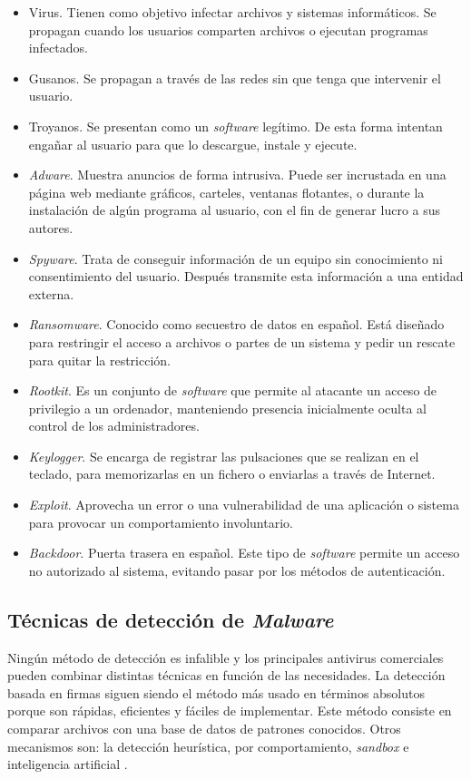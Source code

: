 \begin{itemize}
	\item Virus. Tienen como objetivo infectar archivos y sistemas informáticos. Se propagan cuando los usuarios comparten archivos o ejecutan programas infectados.
	\item Gusanos. Se propagan a través de las redes sin que tenga que intervenir el usuario.
	\item Troyanos. Se presentan como un \textit{software} legítimo. De esta forma intentan engañar al usuario para que lo descargue, instale y ejecute.
	\item \textit{Adware}. Muestra anuncios de forma intrusiva. Puede ser incrustada en una página web mediante gráficos, carteles, ventanas flotantes, o durante la instalación de algún programa al usuario, con el fin de generar lucro a sus autores.
	\item \textit{Spyware}. Trata de conseguir información de un equipo sin conocimiento ni consentimiento del usuario. Después transmite esta información a una entidad externa.
	\item \textit{Ransomware}. Conocido como secuestro de datos en español. Está diseñado para restringir el acceso a archivos o partes de un sistema y pedir un rescate para quitar la restricción.
	\item \textit{Rootkit}. Es un conjunto de \textit{software} que permite al atacante un acceso de privilegio a un ordenador, manteniendo presencia inicialmente oculta al control de los administradores.
	\item \textit{Keylogger}. Se encarga de registrar las pulsaciones que se realizan en el teclado, para memorizarlas en un fichero o enviarlas a través de Internet.
	\item \textit{Exploit}. Aprovecha un error o una vulnerabilidad de una aplicación o sistema para provocar un comportamiento involuntario.
	\item \textit{Backdoor}. Puerta trasera en español. Este tipo de \textit{software} permite un acceso no autorizado al sistema, evitando pasar por los métodos de autenticación.
\end{itemize}

\subsection{Técnicas de detección de \textit{Malware}}
\label{subsec:deteccion_malware}

Ningún método de detección es infalible y los principales antivirus comerciales pueden combinar distintas técnicas en función de las necesidades. La detección basada en firmas siguen siendo el método más usado en términos absolutos porque son rápidas, eficientes y fáciles de implementar. Este método consiste en comparar archivos con una base de datos de patrones conocidos. Otros mecanismos son: la detección heurística, por comportamiento, \textit{sandbox} e inteligencia artificial \cite{antivirus}.

